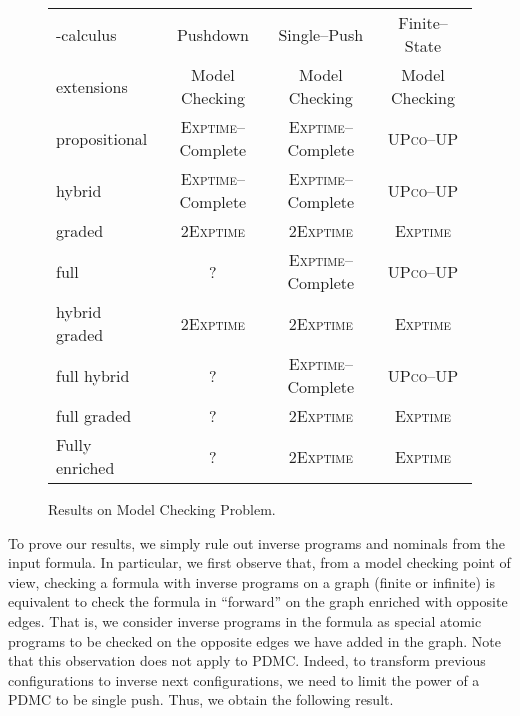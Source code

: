 \documentclass{LMCS}
\theoremstyle{plain}
\def \coUP          {\textsc{co--UP}\xspace}
\def \EXPTIME       {\textsc{Exptime}\xspace}
\def \PDMC          {\textsc{PDMC}\xspace}
\def \TWOEXPTIME    {\textsc{2Exptime}\xspace}
\def \UP            {{\sc UP}}
\def \UP            {\textsc{UP}\xspace}
\begin{document}
\begin{figure}[t]
    {\small
    \begin{tabular}{|l|c|c|c|}
        \hline
        -calculus & Pushdown                        & Single--Push         & Finite--State                 \\
        extensions     & Model Checking                  & Model Checking       & Model Checking                \\
        \hline
        propositional  & \EXPTIME--Complete \cite{Wal96} & \EXPTIME--Complete   & \UP  \coUP \cite{Wil01} \\
        hybrid         & \EXPTIME--Complete              & \EXPTIME--Complete   & \UP  \coUP              \\
        graded         & \TWOEXPTIME                     & \TWOEXPTIME          & \EXPTIME                      \\
        full           & ?                               & \EXPTIME--Complete   & \UP  \coUP              \\
        hybrid graded  & \TWOEXPTIME                     & \TWOEXPTIME          & \EXPTIME                      \\
        full hybrid    & ?                               & \EXPTIME--Complete   & \UP  \coUP              \\
        full graded    & ?                               & \TWOEXPTIME          & \EXPTIME                      \\
        Fully enriched & ?                               & \TWOEXPTIME          & \EXPTIME                      \\
        \hline
    \end{tabular}
    \caption{Results on Model Checking Problem.}
    }
    \label{tab:ModelChecking}
\end{figure}

To prove our results, we simply rule out inverse programs and nominals from the
input formula. In particular, we first observe that, from a model checking
point of view, checking a formula with inverse programs on a graph (finite or
infinite) is equivalent to check the formula in ``forward'' on the graph
enriched with opposite edges. That is, we consider inverse programs in the
formula as special atomic programs to be checked on the opposite edges we have
added in the graph. Note that this observation does not apply to \PDMC. Indeed,
to transform previous configurations to inverse next configurations, we need to
limit the power of a \PDMC to be single push. Thus, we obtain the following
result.
\end{document}

